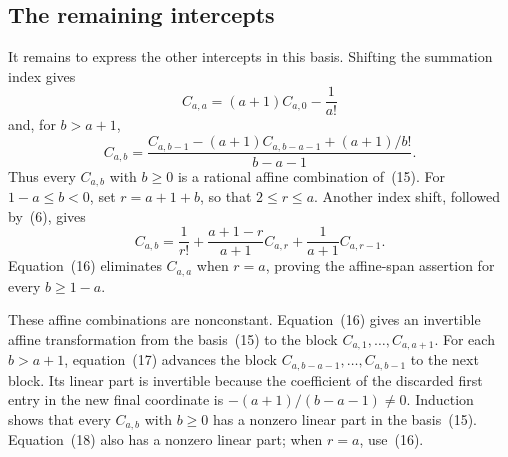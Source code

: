 \documentclass[12pt]{article}
\begin{document}
\subsection{The remaining intercepts}

It remains to express the other intercepts in this basis. Shifting the summation index gives
\[
C_{a,a}=(a+1)C_{a,0}-\frac1{a!}
\tag{16}
\]
and, for $b>a+1$,
\[
C_{a,b}=
\frac{C_{a,b-1}-(a+1)C_{a,b-a-1}+(a+1)/b!}{b-a-1}.
\tag{17}
\]
Thus every $C_{a,b}$ with $b\geq0$ is a rational affine combination of~(15). For $1-a\leq b<0$, set $r=a+1+b$, so that $2\leq r\leq a$. Another index shift, followed by~(6), gives
\[
C_{a,b}
=\frac1{r!}
+\frac{a+1-r}{a+1}C_{a,r}
+\frac1{a+1}C_{a,r-1}.
\tag{18}
\]
Equation~(16) eliminates $C_{a,a}$ when $r=a$, proving the affine-span assertion for every $b\geq1-a$.

These affine combinations are nonconstant. Equation~(16) gives an invertible affine transformation from the basis~(15) to the block $C_{a,1},\ldots,C_{a,a+1}$. For each $b>a+1$, equation~(17) advances the block $C_{a,b-a-1},\ldots,C_{a,b-1}$ to the next block. Its linear part is invertible because the coefficient of the discarded first entry in the new final coordinate is $-(a+1)/(b-a-1)\neq0$. Induction shows that every $C_{a,b}$ with $b\geq0$ has a nonzero linear part in the basis~(15). Equation~(18) also has a nonzero linear part; when $r=a$, use~(16).
\end{document}

